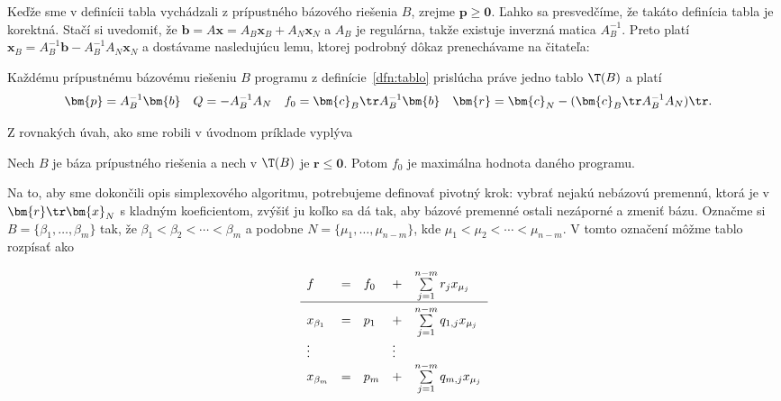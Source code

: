 \noindent
Keďže sme v definícii tabla vychádzali z prípustného bázového riešenia  $B$, zrejme $\bm{p}\ge\bm{0}$.
Ľahko sa presvedčíme, že takáto definícia tabla je korektná. Stačí si uvedomiť, že 
$\bm{b}=A\bm{x}=A_B\bm{x}_B+A_N\bm{x}_N$ a $A_B$ je regulárna, takže existuje inverzná matica
$A_B^{-1}$. Preto platí $\bm{x}_B=A_B^{-1}\bm{b}-A_B^{-1}A_N\bm{x}_N$ a dostávame nasledujúcu lemu,
ktorej podrobný dôkaz prenechávame na čitateľa:

\begin{lema}
  \label{lm:LPtablo}
  Každému prípustnému bázovému riešeniu $B$ programu z definície~\ref{dfn:tablo} prislúcha
  práve jedno tablo $\T(B)$ a platí
  \begin{align*}
    \bm{p} &= A_B^{-1}\bm{b} &
    Q      &= -A_B^{-1}A_N &
    f_0    &= \bm{c}_B\tr A_B^{-1}\bm{b}&
    \bm{r} &= \bm{c}_N-(\bm{c}_B\tr A_B^{-1} A_N)\tr.
  \end{align*}
\end{lema}

\noindent
Z rovnakých úvah, ako sme robili v úvodnom príklade vyplýva

\begin{clm}
  \label{clm:simplexend}
  Nech $B$ je báza prípustného riešenia a nech v $\T(B)$ je $\bm{r}\le\bm{0}$. Potom
  $f_0$ je maximálna hodnota daného programu.
\end{clm}

\noindent
Na to, aby sme dokončili opis simplexového algoritmu, potrebujeme definovať pivotný krok:
vybrať nejakú nebázovú premennú, ktorá je v $\bm{r}\tr\bm{x}_N$ s kladným koeficientom,
zvýšiť ju koľko sa dá tak, aby bázové premenné ostali nezáporné a zmeniť bázu.
Označme si $B=\{\beta_1,\ldots,\beta_m\}$ tak, že $\beta_1<\beta_2<\cdots<\beta_m$
a podobne $N=\{\mu_1,\ldots,\mu_{n-m}\}$, kde $\mu_1<\mu_2<\cdots<\mu_{n-m}$.
V tomto označení môžme tablo rozpísať ako

\begin{equation}
  \label{LP:tablo-ext}
\begin{array}{lllll}
  f & = & f_0 & + & \sum\limits_{j=1}^{n-m} r_jx_{\mu_j}\\[2mm]\hline\rule{0mm}{4ex}
  x_{\beta_1} & = & p_1 & + & \sum\limits_{j=1}^{n-m}q_{1,j}x_{\mu_j}\\
    \vdots    &  & & \vdots\\
  x_{\beta_m} & = & p_m & + & \sum\limits_{j=1}^{n-m}q_{m,j}x_{\mu_j}\\
\end{array}
\end{equation}

